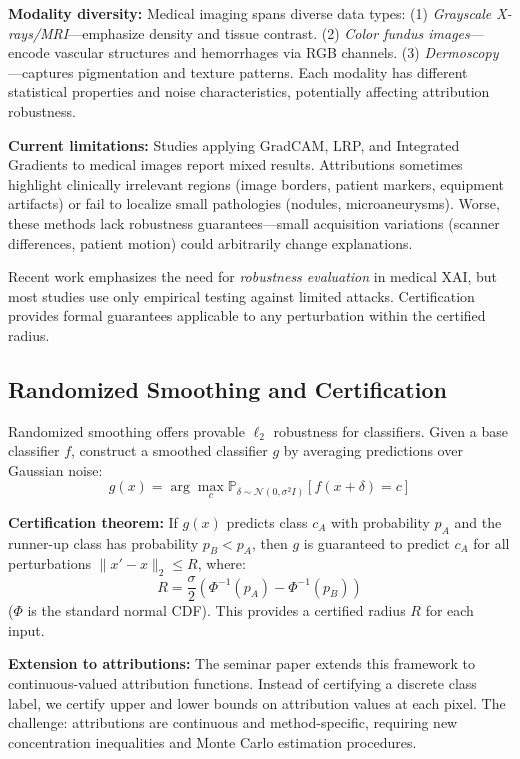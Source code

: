 \documentclass[11pt]{article}
\begin{document}
\textbf{Modality diversity:} Medical imaging spans diverse data types: (1) \textit{Grayscale X-rays/MRI}—emphasize density and tissue contrast. (2) \textit{Color fundus images}—encode vascular structures and hemorrhages via RGB channels. (3) \textit{Dermoscopy}—captures pigmentation and texture patterns. Each modality has different statistical properties and noise characteristics, potentially affecting attribution robustness.

\textbf{Current limitations:} Studies applying GradCAM, LRP, and Integrated Gradients to medical images report mixed results. Attributions sometimes highlight clinically irrelevant regions (image borders, patient markers, equipment artifacts) or fail to localize small pathologies (nodules, microaneurysms). Worse, these methods lack robustness guarantees—small acquisition variations (scanner differences, patient motion) could arbitrarily change explanations.

Recent work \cite{arun2021assessing, salahuddin2022transparency} emphasizes the need for \textit{robustness evaluation} in medical XAI, but most studies use only empirical testing against limited attacks. Certification provides formal guarantees applicable to any perturbation within the certified radius.

\subsection{Randomized Smoothing and Certification}

Randomized smoothing \cite{cohen2019certified} offers provable $\ell_2$ robustness for classifiers. Given a base classifier $f$, construct a smoothed classifier $g$ by averaging predictions over Gaussian noise:
$$g(x) = \arg\max_c \mathbb{P}_{\delta \sim \mathcal{N}(0, \sigma^2 I)}[f(x + \delta) = c]$$

\textbf{Certification theorem:} If $g(x)$ predicts class $c_A$ with probability $p_A$ and the runner-up class has probability $p_B < p_A$, then $g$ is guaranteed to predict $c_A$ for all perturbations $\|x' - x\|_2 \leq R$, where:
$$R = \frac{\sigma}{2} \left( \Phi^{-1}(p_A) - \Phi^{-1}(p_B) \right)$$
($\Phi$ is the standard normal CDF). This provides a certified radius $R$ for each input.

\textbf{Extension to attributions:} The seminar paper extends this framework to continuous-valued attribution functions. Instead of certifying a discrete class label, we certify upper and lower bounds on attribution values at each pixel. The challenge: attributions are continuous and method-specific, requiring new concentration inequalities and Monte Carlo estimation procedures.
\end{document}
